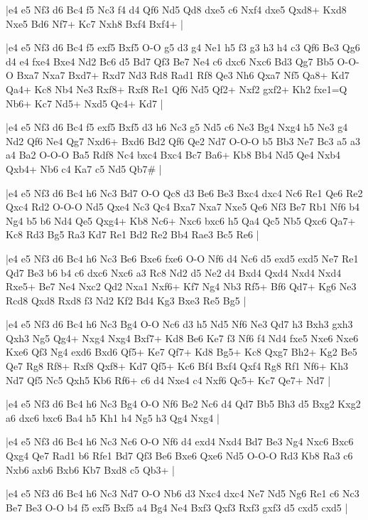 \whitename{}
\blackname{}
\makegametitle
|e4 e5 Nf3 d6 Bc4 f5 Nc3 f4 d4 Qf6 Nd5 Qd8 dxe5 c6 Nxf4 dxe5 Qxd8+ Kxd8 Nxe5 Bd6 Nf7+ Kc7 Nxh8 Bxf4 Bxf4+  |

\whitename{}
\blackname{}
\makegametitle
|e4 e5 Nf3 d6 Bc4 f5 exf5 Bxf5 O-O g5 d3 g4 Ne1 h5 f3 g3 h3 h4 c3 Qf6 Be3 Qg6 d4 e4 fxe4 Bxe4 Nd2 Bc6 d5 Bd7 Qf3 Be7 Ne4 c6 dxc6 Nxc6 Bd3 Qg7 Bb5 O-O-O Bxa7 Nxa7 Bxd7+ Rxd7 Nd3 Rd8 Rad1 Rf8 Qe3 Nh6 Qxa7 Nf5 Qa8+ Kd7 Qa4+ Kc8 Nb4 Ne3 Rxf8+ Rxf8 Re1 Qf6 Nd5 Qf2+ Nxf2 gxf2+ Kh2 fxe1=Q Nb6+ Kc7 Nd5+ Nxd5 Qc4+ Kd7  |

\whitename{}
\blackname{}
\makegametitle
|e4 e5 Nf3 d6 Bc4 f5 exf5 Bxf5 d3 h6 Nc3 g5 Nd5 c6 Ne3 Bg4 Nxg4 h5 Ne3 g4 Nd2 Qf6 Ne4 Qg7 Nxd6+ Bxd6 Bd2 Qf6 Qe2 Nd7 O-O-O b5 Bb3 Ne7 Bc3 a5 a3 a4 Ba2 O-O-O Ba5 Rdf8 Nc4 bxc4 Bxc4 Bc7 Ba6+ Kb8 Bb4 Nd5 Qe4 Nxb4 Qxb4+ Nb6 c4 Ka7 c5 Nd5 Qb7\#  |

\whitename{}
\blackname{}
\makegametitle
|e4 e5 Nf3 d6 Bc4 h6 Nc3 Bd7 O-O Qc8 d3 Be6 Be3 Bxc4 dxc4 Nc6 Re1 Qe6 Re2 Qxc4 Rd2 O-O-O Nd5 Qxe4 Nc3 Qc4 Bxa7 Nxa7 Nxe5 Qe6 Nf3 Be7 Rb1 Nf6 b4 Ng4 b5 b6 Nd4 Qe5 Qxg4+ Kb8 Nc6+ Nxc6 bxc6 h5 Qa4 Qc5 Nb5 Qxc6 Qa7+ Kc8 Rd3 Bg5 Ra3 Kd7 Re1 Bd2 Re2 Bb4 Rae3 Bc5 Re6  |

\whitename{}
\blackname{}
\makegametitle
|e4 e5 Nf3 d6 Bc4 h6 Nc3 Be6 Bxe6 fxe6 O-O Nf6 d4 Nc6 d5 exd5 exd5 Ne7 Re1 Qd7 Be3 b6 b4 c6 dxc6 Nxc6 a3 Rc8 Nd2 d5 Ne2 d4 Bxd4 Qxd4 Nxd4 Nxd4 Rxe5+ Be7 Ne4 Nxc2 Qd2 Nxa1 Nxf6+ Kf7 Ng4 Nb3 Rf5+ Bf6 Qd7+ Kg6 Ne3 Rcd8 Qxd8 Rxd8 f3 Nd2 Kf2 Bd4 Kg3 Bxe3 Re5 Bg5  |

\whitename{}
\blackname{}
\makegametitle
|e4 e5 Nf3 d6 Bc4 h6 Nc3 Bg4 O-O Nc6 d3 h5 Nd5 Nf6 Ne3 Qd7 h3 Bxh3 gxh3 Qxh3 Ng5 Qg4+ Nxg4 Nxg4 Bxf7+ Kd8 Be6 Ke7 f3 Nf6 f4 Nd4 fxe5 Nxe6 Nxe6 Kxe6 Qf3 Ng4 exd6 Bxd6 Qf5+ Ke7 Qf7+ Kd8 Bg5+ Kc8 Qxg7 Bh2+ Kg2 Be5 Qe7 Rg8 Rf8+ Rxf8 Qxf8+ Kd7 Qf5+ Kc6 Bf4 Bxf4 Qxf4 Rg8 Rf1 Nf6+ Kh3 Nd7 Qf5 Nc5 Qxh5 Kb6 Rf6+ c6 d4 Nxe4 c4 Nxf6 Qc5+ Kc7 Qe7+ Nd7  |

\whitename{}
\blackname{}
\makegametitle
|e4 e5 Nf3 d6 Bc4 h6 Nc3 Bg4 O-O Nf6 Be2 Nc6 d4 Qd7 Bb5 Bh3 d5 Bxg2 Kxg2 a6 dxc6 bxc6 Ba4 h5 Kh1 h4 Ng5 h3 Qg4 Nxg4  |

\whitename{}
\blackname{}
\makegametitle
|e4 e5 Nf3 d6 Bc4 h6 Nc3 Nc6 O-O Nf6 d4 exd4 Nxd4 Bd7 Be3 Ng4 Nxc6 Bxc6 Qxg4 Qe7 Rad1 b6 Rfe1 Bd7 Qf3 Be6 Bxe6 Qxe6 Nd5 O-O-O Rd3 Kb8 Ra3 c6 Nxb6 axb6 Bxb6 Kb7 Bxd8 c5 Qb3+  |

\whitename{}
\blackname{}
\makegametitle
|e4 e5 Nf3 d6 Bc4 h6 Nc3 Nd7 O-O Nb6 d3 Nxc4 dxc4 Ne7 Nd5 Ng6 Re1 c6 Nc3 Be7 Be3 O-O b4 f5 exf5 Bxf5 a4 Bg4 Ne4 Bxf3 Qxf3 Rxf3 gxf3 d5 cxd5 cxd5  |

